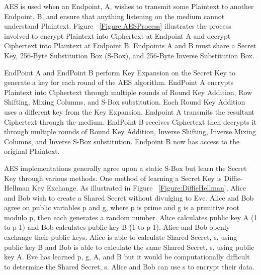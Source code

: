 \documentclass[journal]{IEEEtran}
\begin{document}
AES is used when an Endpoint, A, wishes to transmit some Plaintext to another Endpoint, B, and ensure that 
anything listening on the medium cannot understand Plaintext. Figure ~\ref{Figure:AESProcess} illustrates 
the process involved to encrypt Plaintext into Ciphertext at Endpoint A and decrypt Ciphertext into Plaintext 
at Endpoint B. Endpoints A and B must share a Secret Key, 256-Byte Substitution Box (S-Box), and 256-Byte 
Inverse Substitution Box.

EndPoint A and EndPoint B perform Key Expansion on the Secret Key to generate a key for each round of the 
AES algorithm. EndPoint A encrypts Plaintext into Ciphertext through multiple rounds of Round Key Addition, 
Row Shifting, Mixing Columns, and S-Box substitution. Each Round Key Addition uses a different key from the 
Key Expansion. Endpoint A transmits the resultant Ciphertext through the medium. EndPoint B receives 
Ciphertext then decrypts it through multiple rounds of Round Key Addition, Inverse Shifting, Inverse Mixing 
Columns, and Inverse S-Box substitution. Endpoint B now has access to the original Plaintext.

AES implementations generally agree upon a static S-Box but learn the Secret Key through various methods. 
One method of learning a Secret Key is Diffie-Hellman Key Exchange. As illustrated in Figure 
~\ref{Figure:DiffieHellman}, Alice and Bob wish to create a Shared Secret without divulging to Eve. Alice 
and Bob agree on public variables p and g, where p is prime and g is a primitive root modulo p, then each 
generates a random number. Alice calculates public key A (1 to p-1) and Bob calculates public key B 
(1 to p-1). Alice and Bob openly exchange their public keys. Alice is able to calculate Shared Secret, s, 
using public key B and Bob is able to calculate the same Shared Secret, s, using public key A. Eve has 
learned p, g, A, and B but it would be computationally difficult to determine the Shared Secret, s. Alice 
and Bob can use s to encrypt their data.
\end{document}
